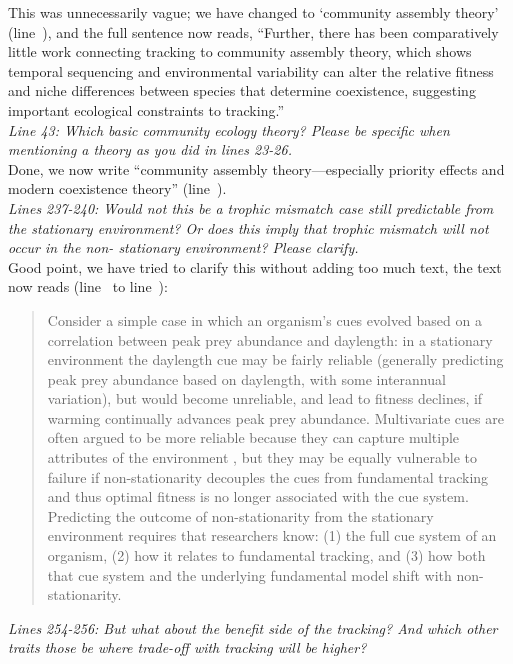 \documentclass[11pt,letterpaper]{article}
\newcommand{\lr}[1]{line~\lineref{#1}}
\begin{document}
This was unnecessarily vague; we have changed to `community assembly theory' (\lr{r3misc3}), and the full sentence now reads, ``Further, there has been comparatively little work connecting tracking to community assembly theory, which shows temporal sequencing and environmental variability can alter the relative fitness and niche differences between species that determine coexistence, suggesting important ecological constraints to tracking.''\\

\emph{Line 43: Which basic community ecology theory? Please be specific when mentioning a theory as
you did in lines 23-26.}\\

Done, we now write ``community assembly theory---especially priority effects and modern coexistence theory'' (\lr{r3misc4}).\\

\emph{Lines 237-240: Would not this be a trophic mismatch case still predictable from the
stationary environment? Or does this imply that trophic mismatch will not occur in the non-
stationary environment? Please clarify.}\\

Good point, we have tried to clarify this without adding too much text, the text now reads (\lr{r3birdsS} to \lr{r3birdsE}):
\begin{quote}
Consider a simple case in which an organism's cues evolved based on a correlation between peak prey abundance and daylength: in a stationary environment the daylength cue may be fairly reliable (generally predicting peak prey abundance based on daylength, with some interannual variation), but would become unreliable, and lead to fitness declines, if warming continually advances peak prey abundance. Multivariate cues are often argued to be more reliable because they can capture multiple attributes of the environment \citep{dore2018,bonamour2019}, but they may be equally vulnerable to failure if non-stationarity decouples the cues from fundamental tracking \citep{bonamour2019} and thus optimal fitness is no longer associated with the cue system. Predicting the outcome of non-stationarity from the stationary environment requires that researchers know: (1) the full cue system of an organism, (2) how it relates to fundamental tracking, and (3) how both that cue system and the underlying fundamental model shift with non-stationarity.
\end{quote}

\emph{Lines 254-256: But what about the benefit side of the tracking? And which other traits those
be where trade-off with tracking will be higher?}\\
\end{document}
